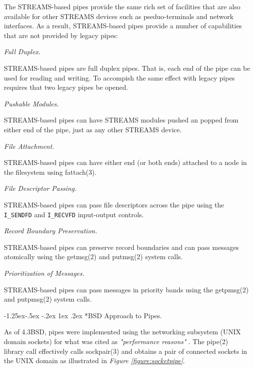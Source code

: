 \documentclass[letterpaper,final,notitlepage,twocolumn,10pt,twoside]{article}
\makeatletter
\let\normalsize\small
\let\small\footnotesize
\let\footnotesize\scriptsize
\let\scriptsize\tiny
\renewcommand\subsubsection{\@startsection{subsubsection}{3}{\z@}%
                                     {-1.25ex\@plus -.5ex \@minus -.2ex}%
                                     {1ex \@plus .2ex}%
                                     {\normalfont\normalsize\bfseries}}
\makeatother
\begin{document}
The STREAMS-based pipes provide the same rich set of facilities that are also
available for other STREAMS devices such as pseduo-terminals and network
interfaces.  As a result, STREAMS-based pipes provide a number of capabilities
that are not provided by legacy pipes:

\begin{description}

\item \textit{Full Duplex.}

STREAMS-based pipes are full duplex pipes.  That is, each end of the pipe can
be used for reading and writing.  To accompish the same effect with legacy
pipes requires that two legacy pipes be opened.

\item \textit{Pushable Modules.}

STREAMS-based pipes can have STREAMS modules pushed an popped from either end
of the pipe, just as any other STREAMS device.

\item \textit{File Attachment.}

STREAMS-based pipes can have either end (or both ends) attached to a node in
the filesystem using fattach(3).

\item \textit{File Descriptor Passing.}

STREAMS-based pipes can pass file descriptors across the pipe using the
\texttt{I\_SENDFD} and \texttt{I\_RECVFD} input-output controls.

\item \textit{Record Boundary Preservation.}

STREAMS-based pipes can preserve record boundaries and can pass messages
atomically using the getmsg(2) and putmsg(2) system calls.

\item \textit{Prioritization of Messages.}

STREAMS-based pipes can pass messages in priority bands using the getpmsg(2)
and putpmsg(2) system calls.

\end{description}

\subsubsection*{BSD Approach to Pipes.}

As of 4.3BSD, pipes were implemented using the networking subsystem (UNIX
domain sockets) for what was cited as \textit{"performance reasons"}
\cite[]{bsd}.  The pipe(2) library call effectively calls sockpair(3) and
obtains a pair of connected sockets in the UNIX domain as illustrated in
\textit{Figure \ref{figure:socketpipe}}.
\end{document}
